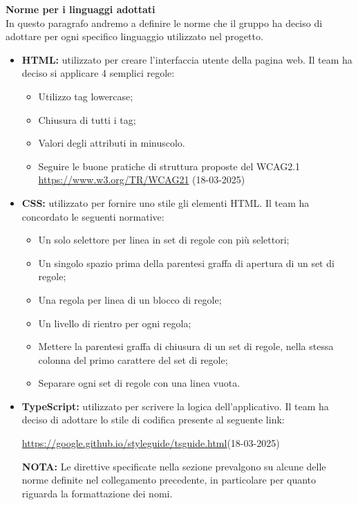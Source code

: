 \noindent \textbf{Norme per i linguaggi adottati}\\
In questo paragrafo andremo a definire le norme che il gruppo ha deciso di adottare per ogni specifico
linguaggio utilizzato nel progetto.
\begin{itemize}
    \item \textbf{HTML:} utilizzato per creare l'interfaccia utente della pagina web. Il team ha deciso si applicare 4 semplici regole:
    \begin{itemize}
        \item Utilizzo tag lowercase;
        \item Chiusura di tutti i tag;
        \item Valori degli attributi in minuscolo.
        \item Seguire le buone pratiche di struttura proposte del WCAG2.1 \url{https://www.w3.org/TR/WCAG21} (18-03-2025)
    \end{itemize}
    \item \textbf{CSS:} utilizzato per fornire uno stile gli elementi HTML. Il team ha concordato le seguenti normative:
    \begin{itemize}
        \item Un solo selettore per linea in set di regole con più selettori;
        \item Un singolo spazio prima della parentesi graffa di apertura di un set di regole;
        \item Una regola per linea di un blocco di regole;
        \item Un livello di rientro per ogni regola;
        \item Mettere la parentesi graffa di chiusura di un set di regole, nella stessa colonna del primo carattere
        del set di regole;
        \item Separare ogni set di regole con una linea vuota.
    \end{itemize}
    \item \textbf{TypeScript:} utilizzato per scrivere la logica dell'applicativo. 
    Il team ha deciso di adottare lo stile di codifica presente al seguente link:
    \begin{center}
        \url{https://google.github.io/styleguide/tsguide.html}(18-03-2025)
    \end{center}
    \textbf{NOTA:}
    Le direttive specificate nella sezione  prevalgono su alcune delle norme definite nel collegamento precedente,
    in particolare per quanto riguarda la formattazione dei nomi.
\end{itemize}
\vspace{1em}

